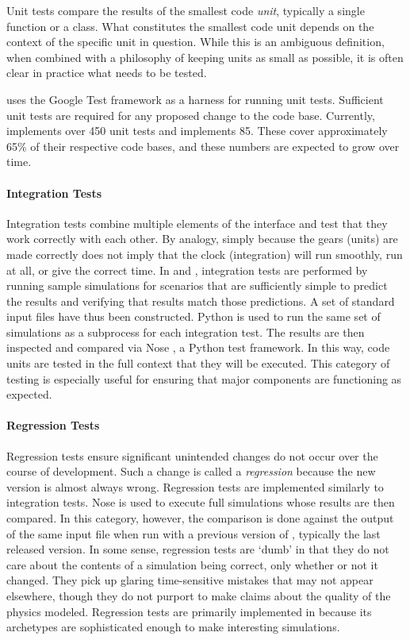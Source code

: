 Unit tests compare the results of the smallest code \emph{unit},
typically a single function or a class. What constitutes the smallest code
unit depends on the context of the specific unit in question. While this is
an ambiguous definition, when combined with a philosophy of keeping units as small
as possible, it is often clear in practice what needs to be tested.

\Cyclus uses the Google Test framework \cite{inc_googletest_2008} as a harness for running unit
tests. Sufficient unit tests are required for any proposed change to the \Cyclus
code base. Currently, \Cyclus implements over 450 unit tests and \Cycamore implements
85.  These cover approximately 65\% of their respective code bases, and these numbers are expected to grow over time.

\paragraph{Integration Tests}

Integration tests combine multiple elements of the
\Cyclus interface and test that they work correctly with each other.  By analogy,
simply because the gears (units) are made correctly does not imply that the
clock (integration) will run smoothly, run at all, or give the correct time.
In \Cyclus and \Cycamore, integration tests are performed by running sample
simulations for scenarios that are sufficiently simple to predict the results and verifying
        that results match those predictions. A set of standard input files have thus been constructed.
Python is used to run the same set of \Cyclus simulations as a subprocess for each integration test.
 The results are then inspected and compared via Nose \cite{pellerin_nose_2007}, a Python test framework.
In this way, \Cyclus code units are tested in the full context that they will be
executed. This category of testing is especially useful for ensuring that
major \Cyclus components are functioning as expected.

\paragraph{Regression Tests}

Regression tests ensure significant unintended changes do not
occur over the course of \Cyclus development. Such a change is called a
\emph{regression} because the new version is almost always wrong.
Regression tests are implemented similarly to integration tests.
Nose is used to execute full \Cyclus simulations whose results
are then compared. In this category, however, the comparison is done against
the output of the same input file when run with a previous version of \Cyclus,
typically the last released version.
In some sense, regression tests are `dumb' in that they do
not care about the contents of a simulation being correct, only whether or not
it changed. They pick up glaring time-sensitive mistakes that may
not appear elsewhere, though they do not purport to make claims about the
quality of the physics modeled. Regression tests are primarily implemented
in \Cycamore because its archetypes are sophisticated enough
to make interesting simulations.

